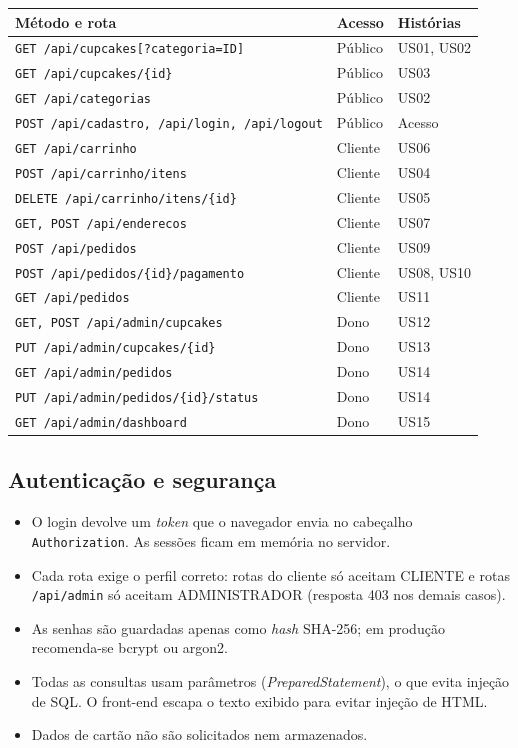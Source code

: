 \documentclass[12pt]{article}
\begin{document}
\small
\begin{longtable}{|p{7.9cm}|p{1.7cm}|p{3.0cm}|}
\hline
\rowcolor{gray!40} \textbf{Método e rota} & \textbf{Acesso} & \textbf{Histórias} \\ \hline
\endhead
\texttt{GET /api/cupcakes[?categoria=ID]} & Público & US01, US02 \\ \hline
\texttt{GET /api/cupcakes/\{id\}} & Público & US03 \\ \hline
\texttt{GET /api/categorias} & Público & US02 \\ \hline
\texttt{POST /api/cadastro, /api/login, /api/logout} & Público & Acesso \\ \hline
\texttt{GET /api/carrinho} & Cliente & US06 \\ \hline
\texttt{POST /api/carrinho/itens} & Cliente & US04 \\ \hline
\texttt{DELETE /api/carrinho/itens/\{id\}} & Cliente & US05 \\ \hline
\texttt{GET, POST /api/enderecos} & Cliente & US07 \\ \hline
\texttt{POST /api/pedidos} & Cliente & US09 \\ \hline
\texttt{POST /api/pedidos/\{id\}/pagamento} & Cliente & US08, US10 \\ \hline
\texttt{GET /api/pedidos} & Cliente & US11 \\ \hline
\texttt{GET, POST /api/admin/cupcakes} & Dono & US12 \\ \hline
\texttt{PUT /api/admin/cupcakes/\{id\}} & Dono & US13 \\ \hline
\texttt{GET /api/admin/pedidos} & Dono & US14 \\ \hline
\texttt{PUT /api/admin/pedidos/\{id\}/status} & Dono & US14 \\ \hline
\texttt{GET /api/admin/dashboard} & Dono & US15 \\ \hline
\end{longtable}

\subsection{Autenticação e segurança}

\begin{itemize}
\item O login devolve um \textit{token} que o navegador envia no cabeçalho \texttt{Authorization}. As sessões ficam em memória no servidor.
\item Cada rota exige o perfil correto: rotas do cliente só aceitam CLIENTE e rotas \texttt{/api/admin} só aceitam ADMINISTRADOR (resposta 403 nos demais casos).
\item As senhas são guardadas apenas como \textit{hash} SHA-256; em produção recomenda-se bcrypt ou argon2.
\item Todas as consultas usam parâmetros (\textit{PreparedStatement}), o que evita injeção de SQL. O front-end escapa o texto exibido para evitar injeção de HTML.
\item Dados de cartão não são solicitados nem armazenados.
\end{itemize}
\end{document}
